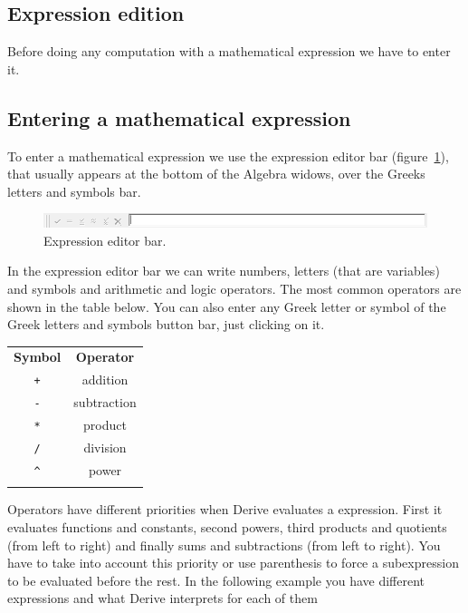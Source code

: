\subsection*{Expression edition}
Before doing any computation with a mathematical expression we have to enter it. 

\subsection*{Entering a mathematical expression}
To enter a mathematical expression we use the expression editor bar (figure~\ref{g:expression-editor}), that usually appears at the bottom of the Algebra widows, over the Greeks letters and symbols bar.

\begin{figure}[h!]
\begin{center}
\includegraphics[scale=0.6]{img/introduction/expression_editor}
\caption{Expression editor bar.} \label{g:expression-editor} 
\end{center} 
\end{figure}


In the expression editor bar we can write numbers, letters (that are variables) and symbols and arithmetic and logic operators. 
The most common operators are shown in the table below. 
You can also enter any Greek letter or symbol of the Greek letters and symbols button bar, just clicking on it.


\begin{center}
\begin{tabular}{cc}
\tcrule
\textbf{Symbol} & \textbf{Operator} \\
\texttt{+} & addition \\
\texttt{-} & subtraction \\
\texttt{*} & product \\
\texttt{/} & division \\
\texttt{\^{}} & power \\
\bcrule
\end{tabular}
\end{center}


Operators have different priorities when Derive evaluates a expression. 
First it evaluates functions and constants, second powers, third products and quotients (from left to right) and finally sums and subtractions (from left to right). 
You have to take into account this priority or use parenthesis to force a subexpression to be evaluated before the rest. 
In the following example you have different expressions and what Derive interprets for each of them


